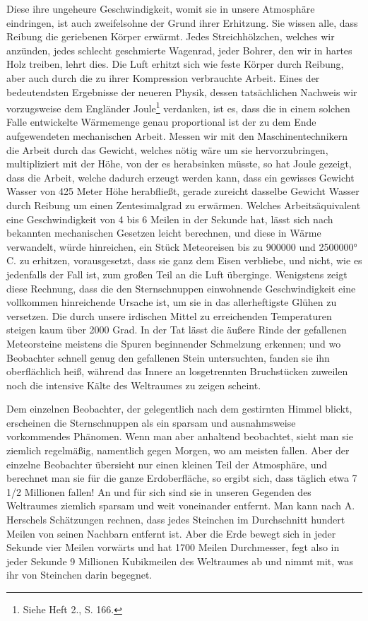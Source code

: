 \documentclass[a4paper, 11pt, oneside, german]{article}
\begin{document}
Diese ihre ungeheure Geschwindigkeit, womit sie in unsere Atmosphäre eindringen, ist auch zweifelsohne der Grund ihrer Erhitzung. Sie wissen alle, dass Reibung die geriebenen Körper erwärmt. Jedes Streichhölzchen, welches wir anzünden, jedes schlecht geschmierte Wagenrad, jeder Bohrer, den wir in hartes Holz treiben, lehrt dies. Die Luft erhitzt sich wie feste Körper durch Reibung, aber auch durch die zu ihrer Kompression verbrauchte Arbeit. Eines der bedeutendsten Ergebnisse der neueren Physik, dessen tatsächlichen Nachweis wir vorzugsweise dem Engländer Joule\footnote{Siehe Heft 2., S. 166.} verdanken, ist es, dass die in einem solchen Falle entwickelte Wärmemenge genau proportional ist der zu dem Ende aufgewendeten mechanischen Arbeit. Messen wir mit den Maschinentechnikern die Arbeit durch das Gewicht, welches nötig wäre um sie hervorzubringen, multipliziert mit der Höhe, von der es herabsinken müsste, so hat Joule gezeigt, dass die Arbeit, welche dadurch erzeugt werden kann, dass ein gewisses Gewicht Wasser von 425 Meter Höhe herabfließt, gerade zureicht dasselbe Gewicht Wasser durch Reibung um einen Zentesimalgrad zu erwärmen. Welches Arbeitsäquivalent eine Geschwindigkeit von 4 bis 6 Meilen in der Sekunde hat, lässt sich nach bekannten mechanischen Gesetzen leicht berechnen, und diese in Wärme verwandelt, würde hinreichen, ein Stück Meteoreisen bis zu 900000 und 2500000° C. zu erhitzen, vorausgesetzt, dass sie ganz dem Eisen verbliebe, und nicht, wie es jedenfalls der Fall ist, zum großen Teil an die Luft überginge. Wenigstens zeigt diese Rechnung, dass die den Sternschnuppen einwohnende Geschwindigkeit eine vollkommen hinreichende Ursache ist, um sie in das allerheftigste Glühen zu versetzen. Die durch unsere irdischen Mittel zu erreichenden Temperaturen steigen kaum über 2000 Grad. In der Tat lässt die äußere Rinde der gefallenen Meteorsteine meistens die Spuren beginnender Schmelzung erkennen; und wo Beobachter schnell genug den gefallenen Stein untersuchten, fanden sie ihn oberflächlich heiß, während das Innere an losgetrennten Bruchstücken zuweilen noch die intensive Kälte des Weltraumes zu zeigen scheint.

Dem einzelnen Beobachter, der gelegentlich nach dem gestirnten Himmel blickt, erscheinen die Sternschnuppen als ein sparsam und ausnahmsweise vorkommendes Phänomen. Wenn man aber anhaltend beobachtet, sieht man sie ziemlich regelmäßig, namentlich gegen Morgen, wo am meisten fallen. Aber der einzelne Beobachter übersieht nur einen kleinen Teil der Atmosphäre, und berechnet man sie für die ganze Erdoberfläche, so ergibt sich, dass täglich etwa 7 1/2 Millionen fallen! An und für sich sind sie in unseren Gegenden des Weltraumes ziemlich sparsam und weit voneinander entfernt. Man kann nach A. Herschels Schätzungen rechnen, dass jedes Steinchen im Durchschnitt hundert Meilen von seinen Nachbarn entfernt ist. Aber die Erde bewegt sich in jeder Sekunde vier Meilen vorwärts und hat 1700 Meilen Durchmesser, fegt also in jeder Sekunde 9 Millionen Kubikmeilen des Weltraumes ab und nimmt mit, was ihr von Steinchen darin begegnet.
\end{document}
